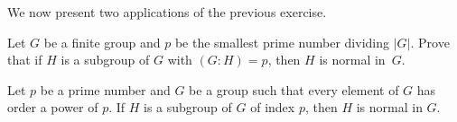 We now present two applications of the previous exercise. 

\begin{bonus}
\label{xca:p_smallest}
    Let $G$ be a finite group and $p$ be the smallest prime number dividing $|G|$. Prove that if $H$ is a subgroup 
    of $G$ with $(G:H)=p$, then $H$ is normal in~$G$. 
\end{bonus}

\begin{bonus}
Let $p$ be a prime number and $G$ be a group such that
every element of $G$ has order a power of $p$. 
If 
$H$ is a subgroup of $G$ of index $p$, then $H$ is normal in $G$.
\end{bonus}

